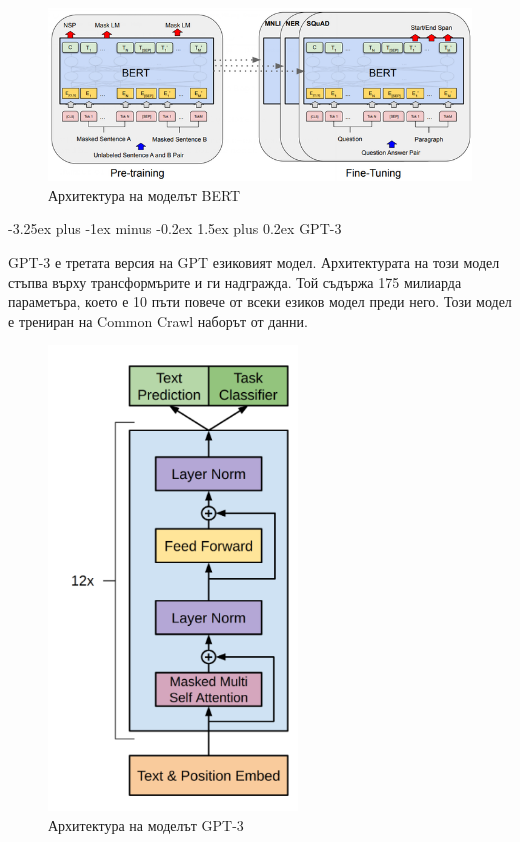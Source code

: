\documentclass{article}
\makeatletter
\renewcommand\paragraph{\@startsection{paragraph}{5}{\z@}%
{3.25ex \@plus1ex \@minus.2ex}%
{-1em}%
{\normalfont\normalsize\bfseries}}
\renewcommand{\paragraph}{\@startsection{paragraph}{4}{0ex}%
{-3.25ex plus -1ex minus -0.2ex}%
{1.5ex plus 0.2ex}%
{\normalfont\normalsize\bfseries}}
\makeatother
\begin{document}
\begin{figure}[H]
  \centering
  \captionsetup{justification=centering}
  \includegraphics[width=450px, keepaspectratio]{chapter-02/bert.png}
  \caption{Архитектура на моделът BERT}
\end{figure}

\paragraph{GPT-3}

GPT-3 е третата версия на GPT езиковият модел. Архитектурата на този модел стъпва върху трансформърите и ги надгражда.
Той съдържа 175 милиарда параметъра, което е 10 пъти повече от всеки езиков модел преди него. Този модел е трениран на
Common Crawl наборът от данни. \cite{gpt-3}

\begin{figure}[H]
  \centering
  \captionsetup{justification=centering}
  \includegraphics[width=250px, keepaspectratio]{chapter-02/gpt-3.png}
  \caption{Архитектура на моделът GPT-3}
\end{figure}
\end{document}
